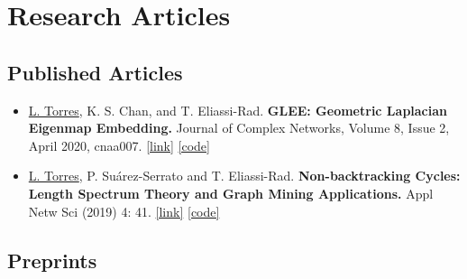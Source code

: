 \documentclass[12pt,]{scrartcl}
\date{}
\newenvironment{myitemize}
{ \begin{itemize}
    \setlength{\itemsep}{5pt}
    \setlength{\parskip}{0pt}
    \setlength{\parsep}{0pt}     }
{ \end{itemize}                  }
\begin{document}
\section{Research Articles}\label{publications}

\subsection{Published Articles}\label{articles}

\begin{myitemize}
\leftskip-0.25in %

\item \underline{L. Torres}, K. S. Chan, and T. Eliassi-Rad. \textbf{GLEE: Geometric Laplacian Eigenmap Embedding.} Journal of Complex Networks, Volume 8, Issue 2, April 2020, cnaa007. \href{https://academic.oup.com/comnet/article/8/2/cnaa007/5775302?guestAccessKey=a6a1e399-bc7d-48db-82ad-5a3beabd81bf}{[link]} \href{https://github.com/leotrs/glee}{[code]}

\item \underline{L. Torres}, P. Su\'arez-Serrato and T. Eliassi-Rad.  \textbf{Non-backtracking Cycles: Length Spectrum Theory and Graph Mining Applications.}  Appl Netw Sci (2019) 4: 41. \href{https://doi.org/10.1007/s41109-019-0147-y}{[link]} \href{https://github.com/leotrs/sunbeam}{[code]}

\end{myitemize}


\subsection{Preprints}\label{preprints}
\end{document}
